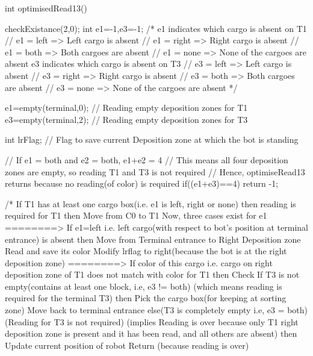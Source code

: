 int optimisedRead13()
{
	checkExistance(2,0);
	 int e1=-1,e3=-1;
	/* e1 indicates which cargo is absent on T1
	       // e1 = left => Left cargo is absent
	       // e1 = right => Right cargo is absent
	       // e1 = both => Both cargoes are absent
	       // e1 = none => None of the cargoes are absent
	   e3 indicates which cargo is absent on T3
	       // e3 = left => Left cargo is absent
	       // e3 = right => Right cargo is absent
	       // e3 = both => Both cargoes are absent
	       // e3 = none => None of the cargoes are absent   */     
	
    e1=empty(terminal,0); // Reading empty deposition zones for T1
    e3=empty(terminal,2); // Reading empty deposition zones for T3
	
    int lrFlag; // Flag to save current Deposition zone at which the bot is standing
	
	// If e1 = both and e2 = both, e1+e2 = 4 
	// This means all four deposition zones are empty, so reading T1 and T3 is not required
	// Hence, optimiseRead13 returns because no reading(of color) is required
    if((e1+e3)==4)  
    {
        return -1;
    }
	
	/* If T1 has at least one cargo box(i.e. e1 is left, right or none) then reading is required for T1
	      then Move from C0 to T1
	           Now, three cases exist for e1
	           ========> If e1=left i.e. left cargo(with respect to bot's position at terminal entrance) is absent
	                        then Move from Terminal entrance to Right Deposition zone
			   	                 Read and save its color
			     		         Modify lrflag to right(because the bot is at the right deposition zone)
			    				 ========> If color of this cargo i.e. cargo on right deposition zone of T1 does not match with color for T1
	                                          then Check If T3 is not empty(contains at least one block, i.e, e3 != both)
			   							                                   (which means reading is required for the terminal T3)
			   							                    then Pick the cargo box(for keeping at sorting zone)
			   											         Move back to terminal entrance
			   										     else(T3 is completely empty i.e, e3 = both) (Reading for T3 is not required)
			   										         (implies Reading is over because only T1 right deposition zone is present and it has been read,
			   											      and all others are absent)
			    										    then Update current position of robot
			   											         Return (because reading is over)
			   
}
